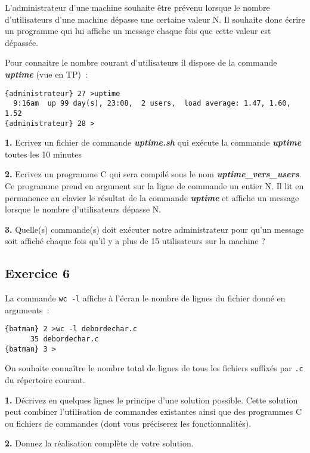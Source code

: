 \documentclass[10pt]{article}
\newcommand{\fich}[1]{{\bf \em #1}}
\begin{document}
L'administrateur d'une machine souhaite être prévenu lorsque le nombre
d'utilisateurs d'une machine dépasse une certaine valeur N.
Il souhaite donc écrire un programme qui lui affiche un message chaque fois
que cette valeur est dépassée.

Pour connaitre le nombre courant d'utilisateurs il dispose de la commande \fich{uptime}
(vue en TP)~:

\begin{verbatim}
{administrateur} 27 >uptime
  9:16am  up 99 day(s), 23:08,  2 users,  load average: 1.47, 1.60, 1.52
{administrateur} 28 >
\end{verbatim}

{\bf 1.} Ecrivez un fichier de commande \fich{uptime.sh} qui exécute 
	la commande \fich{uptime} toutes les 10 minutes

{\bf 2.} Ecrivez un programme C qui sera compilé sous le nom \fich{uptime\_vers\_users}.
	Ce programme prend en argument sur la ligne de commande un entier N. 
	Il lit en permanence au clavier le résultat de la commande \fich{uptime} et 
	affiche un message lorsque le nombre d'utilisateurs dépasse N. 

{\bf 3.} Quelle(s) commande(s) doit exécuter notre administrateur pour qu'un 
	message soit affiché chaque fois qu'il y a plus de 15 utilisateurs sur 
	la machine ?

\subsection*{Exercice 6}

La commande {\tt wc -l} affiche à l'écran le nombre de lignes du fichier
donné en arguments~:

\begin{verbatim}
{batman} 2 >wc -l debordechar.c 
      35 debordechar.c
{batman} 3 >
\end{verbatim}

On souhaite connaître le nombre total de lignes de tous les fichiers 
suffixés par {\tt .c} du répertoire courant.

{\bf 1.} Décrivez en quelques lignes le principe d'une solution possible.
	Cette solution peut combiner l'utilisation de commandes existantes 
	ainsi que des programmes C ou fichiers de commandes 
	(dont vous préciserez les fonctionnalités).

{\bf 2.} Donnez la réalisation complète de votre solution.
\end{document}
